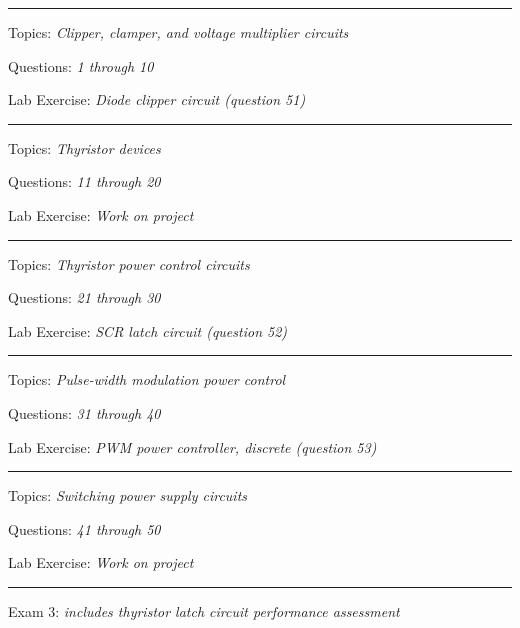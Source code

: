 \vskip 5pt

\hrule \vskip 5pt
\noindent
{}

\hskip 10pt Topics: {\it Clipper, clamper, and voltage multiplier circuits}
 
\hskip 10pt Questions: {\it 1 through 10}
 
\hskip 10pt Lab Exercise: {\it Diode clipper circuit (question 51)}
 
\vskip 10pt
\hrule \vskip 5pt
\noindent
{}

\hskip 10pt Topics: {\it Thyristor devices}
 
\hskip 10pt Questions: {\it 11 through 20}
 
\hskip 10pt Lab Exercise: {\it Work on project}
 
\vskip 10pt
\hrule \vskip 5pt
\noindent
{}

\hskip 10pt Topics: {\it Thyristor power control circuits}
 
\hskip 10pt Questions: {\it 21 through 30}
 
\hskip 10pt Lab Exercise: {\it SCR latch circuit (question 52)}
 

\vskip 10pt
\hrule \vskip 5pt
\noindent
{}

\hskip 10pt Topics: {\it Pulse-width modulation power control}
 
\hskip 10pt Questions: {\it 31 through 40}
 
\hskip 10pt Lab Exercise: {\it PWM power controller, discrete (question 53)}
 
\vskip 10pt
\hrule \vskip 5pt
\noindent
{}

\hskip 10pt Topics: {\it Switching power supply circuits}
 
\hskip 10pt Questions: {\it 41 through 50}
 
\hskip 10pt Lab Exercise: {\it Work on project}
 


\vskip 10pt
\hrule \vskip 5pt
\noindent
{}

\hskip 10pt Exam 3: {\it includes thyristor latch circuit performance assessment}
 

